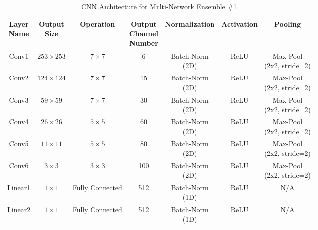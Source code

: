 \documentclass [MAS] {uclathes}
\begin{document}
\begin{table}[h!]
\centering
\footnotesize 
\renewcommand{\arraystretch}{1.3}
\begin{tabular}{ c | c | c | c | c | c | c} 
\hline
\makecell{\textbf{Layer} \\ \textbf{Name}} & \makecell{\textbf{Output} \\ \textbf{Size}} & \textbf{Operation} & \makecell{\textbf{Output} \\ \textbf{Channel} \\ \textbf{Number}} & \textbf{Normalization} & \textbf{Activation} & \textbf{Pooling}\\ 
\hline
\hline
Conv1 & $253 \times 253$ & $7 \times 7$ & 6 & \makecell{Batch-Norm \\ (2D)} & ReLU & \makecell{Max-Pool \\ (2x2, stride=2)}\\
\hline
Conv2 & $124 \times 124$ & $7 \times 7$ & 15 & \makecell{Batch-Norm \\ (2D)} & ReLU & \makecell{Max-Pool \\ (2x2, stride=2)}\\
\hline
Conv3 & $59 \times 59$ & $7 \times 7$ & 30 & \makecell{Batch-Norm \\ (2D)} & ReLU & \makecell{Max-Pool \\ (2x2, stride=2)}\\
\hline
Conv4 & $26 \times 26$ & $5 \times 5$ & 60 & \makecell{Batch-Norm \\ (2D)} & ReLU & \makecell{Max-Pool \\ (2x2, stride=2)}\\
\hline
Conv5 & $11 \times 11$ & $5 \times 5$ & 80 & \makecell{Batch-Norm \\ (2D)} & ReLU & \makecell{Max-Pool \\ (2x2, stride=2)}\\
\hline
Conv6 & $3 \times 3$ & $3 \times 3$ & 100 & \makecell{Batch-Norm \\ (2D)} & ReLU & \makecell{Max-Pool \\ (2x2, stride=2)}\\
\hline
Linear1 & $1 \times 1$ & Fully Connected & 512 & \makecell{Batch-Norm \\ (1D)} & ReLU & N/A\\
\hline
Linear2 & $1 \times 1$ & Fully Connected & 512 & \makecell{Batch-Norm \\ (1D)} & ReLU & N/A\\
\hline  
\end{tabular}
\label{tab:CNN_arch}
\caption{CNN Architecture for Multi-Network Ensemble \#1}
\end{table}
\end{document}
